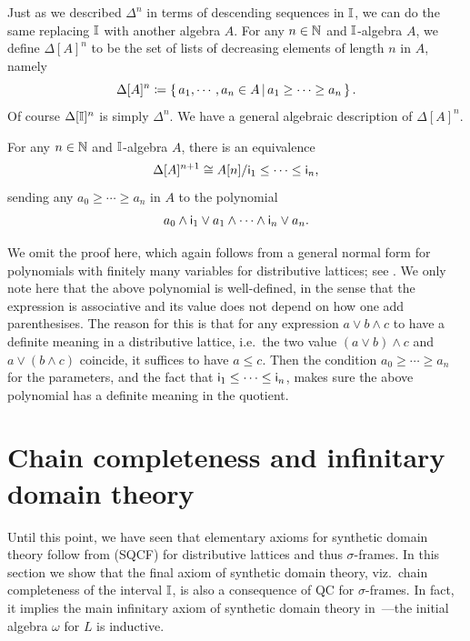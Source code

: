 Just as we described $\Delta^n$ in terms of descending sequences in $\mathbb{I}$, we can do the same replacing $\mathbb{I}$ with another algebra $A$.
For any $n\in\mathbb{N}$ and $\mathbb{I}$-algebra $A$, we define $\Delta[A]^{n}$ to be the set of lists of decreasing elements of length $n$ in $A$, namely
\[ \Delta[A]^{n} \coloneq \left\{\,a_1,\cdots,a_n \in A\,\middle|\,a_1 \ge \cdots \ge a_n\,\right\}\text{.} \]
Of course $\Delta[\mathbb{I}]^n$ is simply $\Delta^n$. We have a general algebraic description of $\Delta[A]^n$.

\begin{proposition}\label{prop:simplicesasalgebra}
  For any $n\in\mathbb{N}$ and $\mathbb{I}$-algebra $A$, there is an equivalence 
  \[ \Delta[A]^{n+1} \cong A[n]/\mathsf{i}_1 \le \cdots \le \mathsf{i}_n\text{,} \]
  sending any $a_0 \ge \cdots \ge a_n$ in $A$ to the polynomial 
  \[ a_0 \wedge \mathsf{i}_1 \vee a_1 \wedge \cdots \wedge \mathsf{i}_n \vee a_n\text{.} \]
\end{proposition}

We omit the proof here, which again follows from a general normal form for polynomials with finitely many variables for distributive lattices; see \citet[Ch.\ 1, Thm.\ 10.21]{lausch2000algebra}. We only note here that the above polynomial is well-defined, in the sense that the expression is associative and its value does not depend on how one add parenthesises. The reason for this is that for any expression $a \vee b \wedge c$ to have a definite meaning in a distributive lattice, i.e.\ the two value $(a \vee b) \wedge c$ and $a \vee (b \wedge c)$ coincide, it suffices to have $a \le c$. Then the condition $a_0 \ge \cdots \ge a_n$ for the parameters, and the fact that $\mathsf{i}_1 \le \cdots \le \mathsf{i}_n$, makes sure the above polynomial has a definite meaning in the quotient.


\section{Chain completeness and infinitary domain theory}\label{sec:infdomain}

Until this point, we have seen that elementary axioms for synthetic domain theory follow from (SQCF) for distributive lattices and thus $\sigma$-frames. In this section we show that the final axiom of synthetic domain theory, viz.\ chain completeness of the interval $\mathbb{I}$, is also a consequence of \gls{QC} for $\sigma$-frames. In fact, it implies the main infinitary axiom of synthetic domain theory in~\citet{fiore-plotkin:1996}---the initial algebra $\omega$ for $L$ is inductive.

